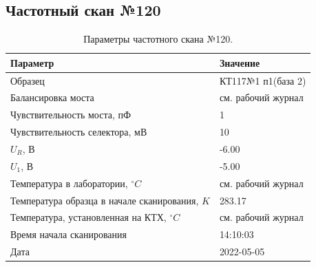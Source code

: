 \subsection{Частотный скан №120}
\begin{table}[!ht]
    \centering
    \caption{Параметры частотного скана №120.}
    \begin{tabular}{|l|l|}
        \hline
        Параметр                                       & Значение                  \\ \hline
        Образец                                        & КТ117№1 п1(база 2)        \\ \hline
        Балансировка моста                             & см. рабочий журнал        \\ \hline
        Чувствительность моста, пФ                     & 1                         \\ \hline
        Чувствительность селектора, мВ                 & 10                        \\ \hline
        $U_R$, В                                       & -6.00                     \\ \hline
        $U_1$, В                                       & -5.00                     \\ \hline
        Температура в лаборатории, $^\circ C$          & см. рабочий журнал        \\ \hline
        Температура образца в начале сканирования, $K$ & 283.17                    \\ \hline
        Температура, установленная на КТХ, $^\circ C$  & см. рабочий журнал        \\ \hline
        Время начала сканирования                      & 14:10:03                  \\ \hline
        Дата                                           & 2022-05-05                \\ \hline
    \end{tabular}
    \label{table:frequency_scan_120}
\end{table}

